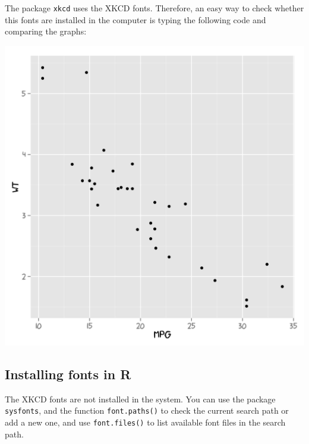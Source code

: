 \documentclass[10pt]{article}
\begin{document}
The package \texttt{xkcd} uses the XKCD fonts. Therefore, an easy way to check whether this fonts are installed in the computer is typing the following code and comparing the graphs:


\begin{center}
\begin{Schunk}
\end{Schunk}
\includegraphics{xkcd-intro-003}
\end{center}

\subsection{Installing fonts in R}



The XKCD fonts are not installed in the system. You can use the package \texttt{sysfonts}, and the function \texttt{font.paths()} to check the current search path or add a new one, and use \texttt{font.files()} to list available font files in the search path.
\end{document}
